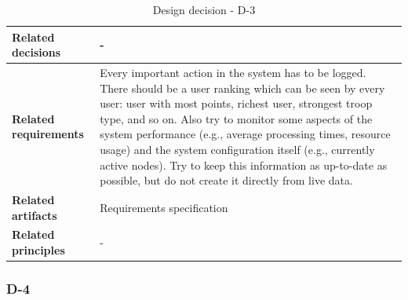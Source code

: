 \documentclass[11pt]{article}
\begin{document}
\begin{table}[h]
\begin{tabularx}{\textwidth}{ | l | X |}
	\hline
	\cellcolor[gray]{0.9}
	\textbf{Related decisions} & - \\
	\hline
	\cellcolor[gray]{0.9}
	\textbf{Related requirements} & Every important action in the system has to be logged. There should be a user ranking which can be seen by every user: user with most points, richest user, strongest troop type, and so on. Also try to monitor some aspects of the system performance (e.g., average processing times, resource usage) and the system configuration itself (e.g., currently active nodes). Try to keep this information as up-to-date as possible, but do not create it directly from live data.\\
	\hline
	\cellcolor[gray]{0.9}
	\textbf{Related artifacts} & Requirements specification\\
	\hline
	\cellcolor[gray]{0.9}
	\textbf{Related principles} & -\\
	\hline
	\end{tabularx}
	\caption{Design decision - D-3}
	\label{dec:D3}
\end{table}

\newpage

\subsubsection{D-4}
\end{document}
